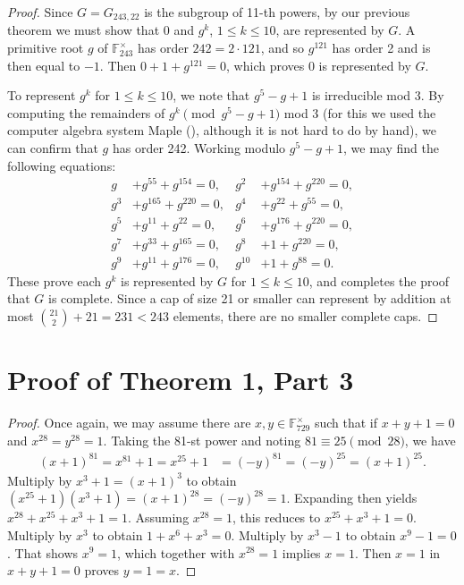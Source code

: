 \documentclass[12pt]{amsart}
\theoremstyle{definition}
\begin{document}
\begin{proof}
  Since $G=G_{243,22}$ is the subgroup of 11-th powers, by our
  previous theorem we must show that 0 and $g^k$, $1\le k\le 10$, are
  represented by $G$.   A primitive root $g$ of
  $\mathbb{F}_{243}^\times$ has order $242=2\cdot 121$, and
  so $g^{121}$ has order 2 and is then equal to $-1$. Then
  $0+1+g^{121}=0$, which proves $0$ is represented by $G$.

  To represent $g^k$ for $1\le k\le 10$, we note that $g^5-g+1$ is
  irreducible mod 3. By computing the remainders of
  $g^k\pmod{g^5-g+1}$ mod 3 (for this we used the computer algebra
  system Maple (\cite{Maple2025}), although it is not hard to do by
  hand), we can confirm that $g$ has order 242.
  Working modulo $g^5-g+1$, we may find the following
  equations:
  \begin{align*}
    g&+ g^{55}+ g^{154}=0,
    &  g^{2}&+ g^{154}+ g^{220}=0,\\
    g^{3}&+ g^{165}+ g^{220}=0,
    &  g^{4}&+ g^{22}+ g^{55}=0,\\
    g^{5}&+ g^{11}+ g^{22}=0,
    &  g^{6}&+ g^{176}+ g^{220}=0,\\
    g^{7}&+ g^{33}+ g^{165}=0, 
    &  g^{8}&+1+ g^{220}=0,\\
    g^{9}&+ g^{11}+ g^{176}=0,
    &  g^{10}&+1 + g^{88}=0.
  \end{align*}
  These prove each $g^k$ is represented by $G$ for $1\le k\le 10$, and
  completes the proof that $G$ is complete.  Since a cap of size 21 or
  smaller can represent by addition at most
  $\binom{21}{2}+21=231< 243$ elements, there are no smaller complete
  caps. 
\end{proof}

\section{Proof of Theorem 1, Part 3}

\begin{proof}
  Once again, we may assume there are $x,y\in \mathbb{F}_{729}^\times$
  such that if $x+y+1=0$ and $x^{28}=y^{28}=1$.  Taking the 81-st
  power and noting $81\equiv 25\pmod{28}$, we have
  \begin{align*}
    (x+1)^{81}=x^{81}+1=x^{25}+1&=(-y)^{81}=(-y)^{25}=(x+1)^{25}.
  \end{align*}
  Multiply by $x^3+1=(x+1)^3$ to obtain
  $(x^{25}+1)(x^3+1)=(x+1)^{28}=(-y)^{28}=1$.
  Expanding then yields $x^{28}+x^{25}+x^3+1=1$.
  Assuming $x^{28}=1$, this reduces to $x^{25}+x^3+1=0$. Multiply by
  $x^3$ to obtain $1+x^6+x^3=0$. Multiply by $x^3-1$ to obtain
  $x^9-1=0$.  That shows $x^9=1$, which together with $x^{28}=1$
  implies $x=1$. Then $x=1$ in $x+y+1=0$ proves $y=1=x$.  
\end{proof}
\end{document}
